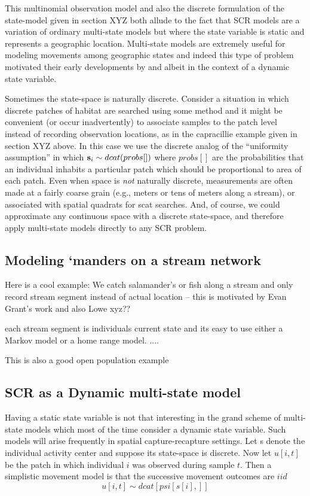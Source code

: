 {This multinomial observation model and also the discrete formulation
of the state-model given in section XYZ both allude to the fact that
SCR models are a variation of 
ordinary multi-state models \citep[][Chapt. 9]{kery_schaub:2011}
but where the state variable is static and represents a
geographic location. Multi-state models are extremely useful for
modeling movements among geographic states and indeed this type of
problem motivated their early developments by
\citet{arnason:1972,arnason:1973} and 
\citet{hestbeck_etal:1991} albeit in the context of a dynamic state
variable.  

Sometimes the state-space is naturally discrete. Consider a situation
in which discrete patches of habitat are searched using some method
and it might be convenient (or occur inadvertently) to associate
samples to the patch level instead of recording observation locations,
as in the capracillie example given in section XYZ above.  In this
case we use the discrete analog of the ``uniformity assumption'' in
which ${\bf s}_{i} \sim dcat(probs[])$ where $probs[]$ are the
probabilities that an individual inhabits a particular patch which
should be proportional to area of each patch.  Even when space is {\it
  not} naturally discrete, measurements are often made at a fairly
coarse grain (e.g., meters or tens of meters along a stream), or
associated with spatial quadrats for scat searches. And, of course, we
could approximate any continuous space with a discrete state-space,
and therefore apply multi-state models directly to any SCR problem.

\subsection{Modeling ‘manders on a stream network}

Here is a cool example: We catch salamander’s or fish along a stream
and only record stream segment instead of actual location – this is
motivated by Evan Grant’s work and also Lowe xyz??

each stream segment is individuals current state and its easy to use
either a Markov model or a home range model. ....

This is also a good open population example

\subsection{SCR as a Dynamic multi-state model}

Having a static state variable is not that interesting in the grand
scheme of multi-state models which most of the time consider a dynamic
state variable. Such models will arise frequently in spatial
capture-recapture settings. Let s denote the individual activity
center and suppose its state-space is discrete.  Now let $u[i,t]$ be
the patch in which individual $i$ was observed during sample $t$. Then
a simplistic movement model is that the successive movement outcomes
are $iid$
\[
u[i,t] \sim  dcat[ psi[s[i],] ]
\]

}
